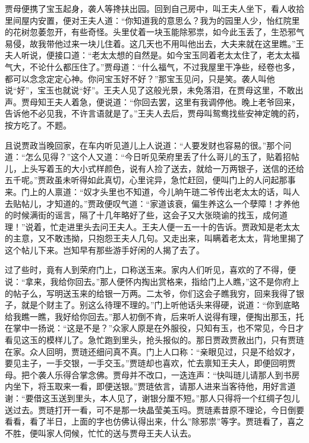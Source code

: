 \begin{parag}
    贾母便携了宝玉起身，袭人等搀扶出园。回到自己房中，叫王夫人坐下，看人收拾里间屋内安置，便对王夫人道：“你知道我的意思么？我为的园里人少，怡红院里的花树忽萎忽开，有些奇怪。头里仗着一块玉能除邪祟，如今此玉丢了，生恐邪气易侵，故我带他过来一块儿住着。这几天也不用叫他出去，大夫来就在这里瞧。”王夫人听说，便接口道：“老太太想的自然是。如今宝玉同着老太太住了，老太太福气大，不论什么都压住了。”贾母道：“什么福气，不过我屋里干净些，经卷也多，都可以念念定定心神。你问宝玉好不好？”那宝玉见问，只是笑。袭人叫他说“好”，宝玉也就说“好”。王夫人见了这般光景，未免落泪，在贾母这里，不敢出声。贾母知王夫人着急，便说道：“你回去罢，这里有我调停他。晚上老爷回来，告诉他不必见我，不许言语就是了。”王夫人去后，贾母叫鸳鸯找些安神定魄的药，按方吃了。不题。
\end{parag}


\begin{parag}
    且说贾政当晚回家，在车内听见道儿上人说道：“人要发财也容易的很。”那个问道：“怎么见得？”这个人又道：“今日听见荣府里丢了什么哥儿的玉了，贴着招帖儿，上头写着玉的大小式样颜色，说有人捡了送去，就给一万两银子，送信的还给五千呢。”贾政虽未听得如此真切，心里诧异，急忙赶回，便叫门上的人问起那事来。门上的人禀道：“奴才头里也不知道，今儿晌午琏二爷传出老太太的话，叫人去贴帖儿，才知道的。”贾政便叹气道：“家道该衰，偏生养这么一个孽障！才养他的时候满街的谣言，隔了十几年略好了些，这会子又大张晓谕的找玉，成何道理！”说着，忙走进里头去问王夫人。王夫人便一五一十的告诉。贾政知是老太太的主意，又不敢违拗，只抱怨王夫人几句。又走出来，叫瞒着老太太，背地里揭了这个帖儿下来。岂知早有那些游手好闲的人揭了去了。
\end{parag}


\begin{parag}
    过了些时，竟有人到荣府门上，口称送玉来。家内人们听见，喜欢的了不得，便说：“拿来，我给你回去。”那人便怀内掏出赏格来，指给门上人瞧，”这不是你府上的帖子么，写明送玉来的给银一万两。二太爷，你们这会子瞧我穷，回来我得了银子，就是个财主了。别这么待理不理的。”门上听他话头来得硬，说道：“你到底略给我瞧一瞧，我好给你回去。”那人初倒不肯，后来听人说得有理，便掏出那玉，托在掌中一扬说：“这是不是？”众家人原是在外服役，只知有玉，也不常见，今日才看见这玉的模样儿了。急忙跑到里头，抢头报似的。那日贾政贾赦出门，只有贾琏在家。众人回明，贾琏还细问真不真。门上人口称：“亲眼见过，只是不给奴才，要见主子，一手交银，一手交玉。”贾琏却也喜欢，忙去禀知王夫人，即便回明贾母。把个袭人乐得合掌念佛。贾母并不改口，一迭连声：“快叫琏儿请那人到书房内坐下，将玉取来一看，即便送银。”贾琏依言，请那人进来当客待他，用好言道谢：“要借这玉送到里头，本人见了，谢银分厘不短。”那人只得将一个红绸子包儿送过去。贾琏打开一看，可不是那一块晶莹美玉吗。贾琏素昔原不理论，今日倒要看看，看了半日，上面的字也仿佛认得出来，什么”除邪祟”等字。贾琏看了，喜之不胜，便叫家人伺候，忙忙的送与贾母王夫人认去。
\end{parag}


